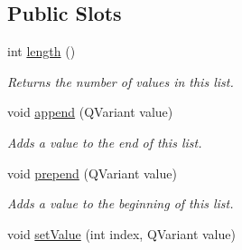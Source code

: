 \subsection*{Public Slots}
\begin{DoxyCompactItemize}
\item 
\hypertarget{class_picto_1_1_variable_list_a6278eaa1e8e5bbb62bb77c7cf660428f}{int \hyperlink{class_picto_1_1_variable_list_a6278eaa1e8e5bbb62bb77c7cf660428f}{length} ()}\label{class_picto_1_1_variable_list_a6278eaa1e8e5bbb62bb77c7cf660428f}

\begin{DoxyCompactList}\small\item\em Returns the number of values in this list. \end{DoxyCompactList}\item 
\hypertarget{class_picto_1_1_variable_list_a2a0d0bc12e4365ffd450d0ec8b8594ae}{void \hyperlink{class_picto_1_1_variable_list_a2a0d0bc12e4365ffd450d0ec8b8594ae}{append} (Q\-Variant value)}\label{class_picto_1_1_variable_list_a2a0d0bc12e4365ffd450d0ec8b8594ae}

\begin{DoxyCompactList}\small\item\em Adds a value to the end of this list. \end{DoxyCompactList}\item 
\hypertarget{class_picto_1_1_variable_list_a4fa392b5b83d3331836f979d6175ae7c}{void \hyperlink{class_picto_1_1_variable_list_a4fa392b5b83d3331836f979d6175ae7c}{prepend} (Q\-Variant value)}\label{class_picto_1_1_variable_list_a4fa392b5b83d3331836f979d6175ae7c}

\begin{DoxyCompactList}\small\item\em Adds a value to the beginning of this list. \end{DoxyCompactList}\item 
\hypertarget{class_picto_1_1_variable_list_a1a81a6a9285bc155ab9200a33be86cc3}{void \hyperlink{class_picto_1_1_variable_list_a1a81a6a9285bc155ab9200a33be86cc3}{set\-Value} (int index, Q\-Variant value)}\label{class_picto_1_1_variable_list_a1a81a6a9285bc155ab9200a33be86cc3}


\end{DoxyCompactItemize}
